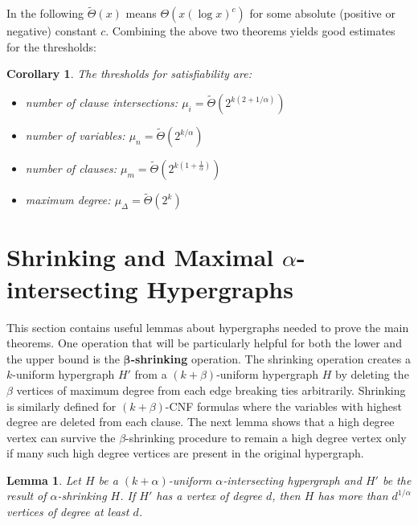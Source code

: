 \documentclass[11pt,letterpaper]{article}
\newtheorem{lemma}[theorem]{Lemma}
\newtheorem{corollary}[theorem]{Corollary}
\begin{document}
\medskip

In the following $\tilde{\Theta}(x)$ means $\Theta(x (\log x)^c)$ for some absolute 
(positive or negative) constant $c$. Combining the above two theorems yields good estimates for the thresholds: 

\begin{corollary}\label{thm:thresholds}
The thresholds for satisfiability are:
\begin{itemize}
	\item number of clause intersections: $\mu_{i} = \tilde{\Theta}(2^{k(2+1/\alpha)})$
	\item number of variables: $\mu_n = \tilde{\Theta}(2^{k/\alpha})$
	\item number of clauses: $\mu_m = \tilde{\Theta}(2^{k(1+\frac{1}{\alpha})})$
	\item maximum degree:	$\mu_{\Delta} = \tilde{\Theta}(2^{k})$
\end{itemize}
\end{corollary}



\section{Shrinking and Maximal $\alpha$-intersecting Hypergraphs}\label{sec:shrinking-hypergraphs}
This section contains useful lemmas about hypergraphs needed to prove the main theorems. One operation that will be particularly helpful for both the lower and the upper bound is the $\mathbf \beta${\bfseries -shrinking} operation. The shrinking operation creates a $k$-uniform hypergraph $H'$ from a $(k+\beta)$-uniform hypergraph $H$ by deleting the $\beta$ vertices of maximum degree from each edge breaking ties arbitrarily. Shrinking is similarly defined for $(k+\beta)$-CNF formulas where the variables with highest degree are deleted from each clause. The next lemma shows that a high degree vertex can survive the $\beta$-shrinking procedure to remain a high degree vertex only if many such high degree vertices are present in the original hypergraph.\\
 
\begin{lemma}\label{lemma:shrinking}
Let $H$ be a $(k+\alpha)$-uniform $\alpha$-intersecting hypergraph and $H'$ be the result of $\alpha$-shrinking $H$. If $H'$ has a vertex of degree $d$, then $H$ has more than $d^{1/\alpha}$ vertices of degree at least $d$. 
\end{lemma}
\end{document}
